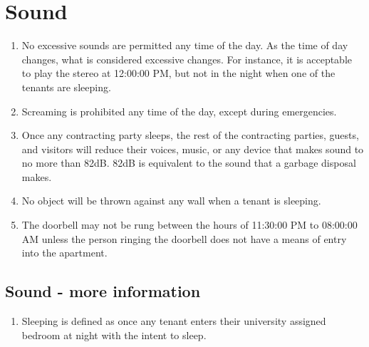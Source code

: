 \documentclass[10pt]{article}
\begin{document}
\section{Sound}
\begin{enumerate}
	\item No excessive sounds are permitted any time of the day. As the time of day changes, what is considered excessive changes. For instance, it is acceptable to play the stereo at 12:00:00 PM, but not in the night when one of the tenants are sleeping.
	\item Screaming is prohibited any time of the day, except during emergencies.
	\item Once any contracting party sleeps, the rest of the contracting parties, guests, and visitors will reduce their voices, music, or any device that makes sound to no more than 82dB. 82dB is equivalent to the sound that a garbage disposal makes.
	\item No object will be thrown against any wall when a tenant is sleeping.
	\item The doorbell may not be rung between the hours of 11:30:00 PM to 08:00:00 AM unless the person ringing the doorbell does not have a means of entry into the apartment.

\end{enumerate}
\subsection{Sound - more information}
\begin{enumerate}
	\item Sleeping is defined as once any tenant enters their university assigned bedroom at night with the intent to sleep.
\end{enumerate}
\end{document}
